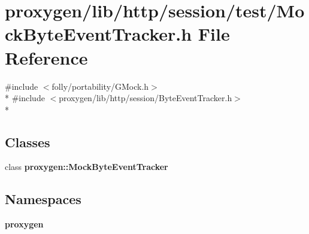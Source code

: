 \section{proxygen/lib/http/session/test/\+Mock\+Byte\+Event\+Tracker.h File Reference}
\label{MockByteEventTracker_8h}
{\ttfamily \#include $<$folly/portability/\+G\+Mock.\+h$>$}\\*
{\ttfamily \#include $<$proxygen/lib/http/session/\+Byte\+Event\+Tracker.\+h$>$}\\*
\subsection*{Classes}
\begin{DoxyCompactItemize}
\item 
class {\bf proxygen\+::\+Mock\+Byte\+Event\+Tracker}
\end{DoxyCompactItemize}
\subsection*{Namespaces}
\begin{DoxyCompactItemize}
\item 
 {\bf proxygen}
\end{DoxyCompactItemize}
